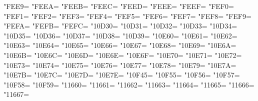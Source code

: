\XeTeXcharclass"FEE9=\KclassArabU
\XeTeXcharclass"FEEA=\KclassArabU
\XeTeXcharclass"FEEB=\KclassArabU
\XeTeXcharclass"FEEC=\KclassArabU
\XeTeXcharclass"FEED=\KclassArabU
\XeTeXcharclass"FEEE=\KclassArabU
\XeTeXcharclass"FEEF=\KclassArabU
\XeTeXcharclass"FEF0=\KclassArabU
\XeTeXcharclass"FEF1=\KclassArabU
\XeTeXcharclass"FEF2=\KclassArabU
\XeTeXcharclass"FEF3=\KclassArabU
\XeTeXcharclass"FEF4=\KclassArabU
\XeTeXcharclass"FEF5=\KclassArabU
\XeTeXcharclass"FEF6=\KclassArabU
\XeTeXcharclass"FEF7=\KclassArabU
\XeTeXcharclass"FEF8=\KclassArabU
\XeTeXcharclass"FEF9=\KclassArabU
\XeTeXcharclass"FEFA=\KclassArabU
\XeTeXcharclass"FEFB=\KclassArabU
\XeTeXcharclass"FEFC=\KclassArabU
\XeTeXcharclass"10D30=\KclassArabU
\XeTeXcharclass"10D31=\KclassArabU
\XeTeXcharclass"10D32=\KclassArabU
\XeTeXcharclass"10D33=\KclassArabU
\XeTeXcharclass"10D34=\KclassArabU
\XeTeXcharclass"10D35=\KclassArabU
\XeTeXcharclass"10D36=\KclassArabU
\XeTeXcharclass"10D37=\KclassArabU
\XeTeXcharclass"10D38=\KclassArabU
\XeTeXcharclass"10D39=\KclassArabU
\XeTeXcharclass"10E60=\KclassArabU
\XeTeXcharclass"10E61=\KclassArabU
\XeTeXcharclass"10E62=\KclassArabU
\XeTeXcharclass"10E63=\KclassArabU
\XeTeXcharclass"10E64=\KclassArabU
\XeTeXcharclass"10E65=\KclassArabU
\XeTeXcharclass"10E66=\KclassArabU
\XeTeXcharclass"10E67=\KclassArabU
\XeTeXcharclass"10E68=\KclassArabU
\XeTeXcharclass"10E69=\KclassArabU
\XeTeXcharclass"10E6A=\KclassArabU
\XeTeXcharclass"10E6B=\KclassArabU
\XeTeXcharclass"10E6C=\KclassArabU
\XeTeXcharclass"10E6D=\KclassArabU
\XeTeXcharclass"10E6E=\KclassArabU
\XeTeXcharclass"10E6F=\KclassArabU
\XeTeXcharclass"10E70=\KclassArabU
\XeTeXcharclass"10E71=\KclassArabU
\XeTeXcharclass"10E72=\KclassArabU
\XeTeXcharclass"10E73=\KclassArabU
\XeTeXcharclass"10E74=\KclassArabU
\XeTeXcharclass"10E75=\KclassArabU
\XeTeXcharclass"10E76=\KclassArabU
\XeTeXcharclass"10E77=\KclassArabU
\XeTeXcharclass"10E78=\KclassArabU
\XeTeXcharclass"10E79=\KclassArabU
\XeTeXcharclass"10E7A=\KclassArabU
\XeTeXcharclass"10E7B=\KclassArabU
\XeTeXcharclass"10E7C=\KclassArabU
\XeTeXcharclass"10E7D=\KclassArabU
\XeTeXcharclass"10E7E=\KclassArabU
\XeTeXcharclass"10F45=\KclassArabU
\XeTeXcharclass"10F55=\KclassArabU
\XeTeXcharclass"10F56=\KclassArabU
\XeTeXcharclass"10F57=\KclassArabU
\XeTeXcharclass"10F58=\KclassArabU
\XeTeXcharclass"10F59=\KclassArabU
\XeTeXcharclass"11660=\KclassArabU
\XeTeXcharclass"11661=\KclassArabU
\XeTeXcharclass"11662=\KclassArabU
\XeTeXcharclass"11663=\KclassArabU
\XeTeXcharclass"11664=\KclassArabU
\XeTeXcharclass"11665=\KclassArabU
\XeTeXcharclass"11666=\KclassArabU
\XeTeXcharclass"11667=\KclassArabU
